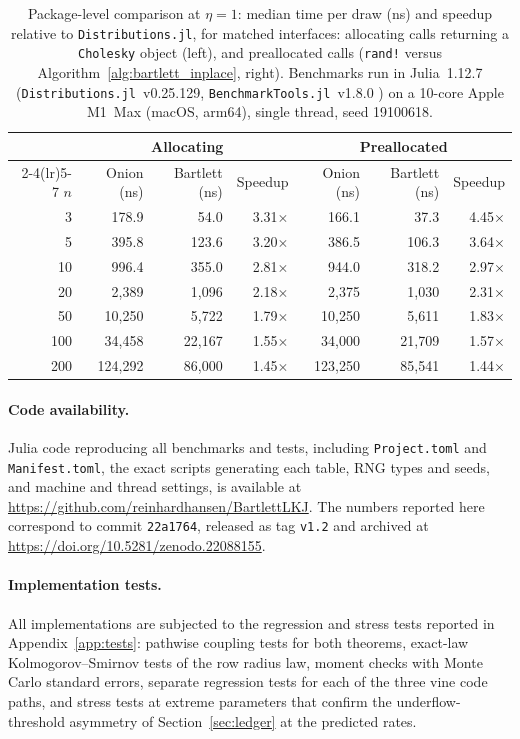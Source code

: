 \documentclass[12pt,english]{article}
\theoremstyle{plain} %
\theoremstyle{definition} %
\theoremstyle{remark} %
\newcommand{\repourl}{\url{https://github.com/reinhardhansen/BartlettLKJ}}
\newcommand{\repodoi}{\url{https://doi.org/10.5281/zenodo.22088155}}
\newcommand{\repocommit}{\texttt{22a1764}}
\newcommand{\repotag}{\texttt{v1.2}}
\newcommand{\testslocation}{Appendix~\ref{app:tests}}
\newcommand{\testslocation}{the supplementary material}
\begin{document}
\begin{table}[t]
\centering
\caption{Package-level comparison at $\eta=1$: median time per draw (ns) and speedup relative to \texttt{Distributions.jl}, for matched interfaces: allocating calls returning a \texttt{Cholesky} object (left), and preallocated calls (\texttt{rand!} versus Algorithm~\ref{alg:bartlett_inplace}, right).
Benchmarks run in Julia~1.12.7 \citep{Bezanson:2017} (\texttt{Distributions.jl}~v0.25.129, \texttt{BenchmarkTools.jl}~v1.8.0 \citep{ChenRevels:2016})
on a 10-core Apple M1~Max (macOS, arm64), single thread, seed 19100618.}
\label{tab:benchmarks}
\begin{tabular}{rrrrrrr}
\toprule
& \multicolumn{3}{c}{Allocating} & \multicolumn{3}{c}{Preallocated} \\
\cmidrule(lr){2-4}\cmidrule(lr){5-7}
$n$ & Onion (ns) & Bartlett (ns) & Speedup & Onion (ns) & Bartlett (ns) & Speedup \\
\midrule
  3 &    178.9 &     54.0 & 3.31$\times$ &    166.1 &     37.3 & 4.45$\times$ \\
  5 &    395.8 &    123.6 & 3.20$\times$ &    386.5 &    106.3 & 3.64$\times$ \\
 10 &    996.4 &    355.0 & 2.81$\times$ &    944.0 &    318.2 & 2.97$\times$ \\
 20 &  2{,}389 &  1{,}096 & 2.18$\times$ &  2{,}375 &  1{,}030 & 2.31$\times$ \\
 50 & 10{,}250 &  5{,}722 & 1.79$\times$ & 10{,}250 &  5{,}611 & 1.83$\times$ \\
100 & 34{,}458 & 22{,}167 & 1.55$\times$ & 34{,}000 & 21{,}709 & 1.57$\times$ \\
200 & 124{,}292 & 86{,}000 & 1.45$\times$ & 123{,}250 & 85{,}541 & 1.44$\times$ \\
\bottomrule
\end{tabular}
\end{table}

\paragraph{Code availability.}
Julia code reproducing all benchmarks and tests, including \texttt{Project.toml} and \texttt{Manifest.toml}, the exact scripts generating each table, RNG types and seeds, and machine and thread settings, is available at \repourl. The numbers reported here correspond to commit \repocommit, released as tag \repotag{} and archived at \repodoi.

\paragraph{Implementation tests.}
All implementations are subjected to the regression and stress tests reported in \testslocation: pathwise coupling tests for both theorems, exact-law Kolmogorov--Smirnov tests of the row radius law, moment checks with Monte Carlo standard errors, separate regression tests for each of the three vine code paths, and stress tests at extreme parameters that confirm the underflow-threshold asymmetry of Section~\ref{sec:ledger} at the predicted rates.
\end{document}
